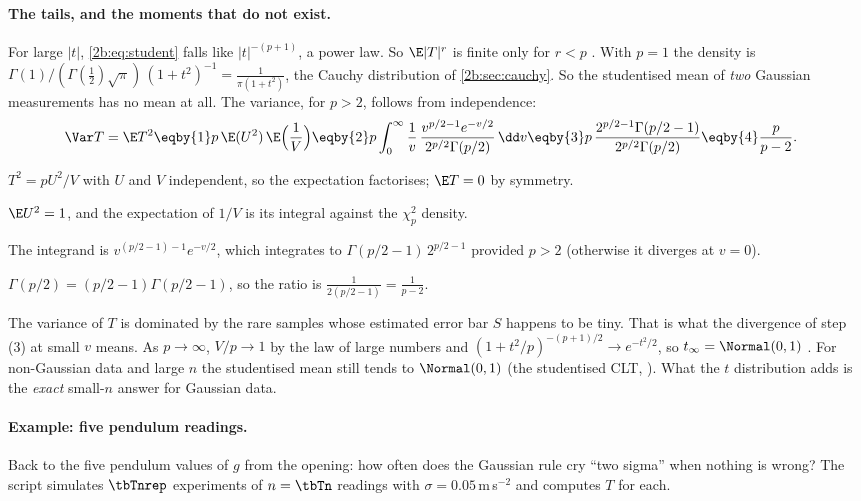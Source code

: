 \paragraph{The tails, and the moments that do not exist.} For large $|t|$, \eqref{2b:eq:student} falls like $|t|^{-(p+1)}$, a power law. So $\E|T|^r$ is finite only for $r<p$ . With $p=1$ the density is $\Gamma(1)/(\Gamma(\frac12)\sqrt\pi)\,(1+t^2)^{-1}=\frac{1}{\pi(1+t^2)}$, the Cauchy distribution of \cref{2b:sec:cauchy}. So the studentised mean of \emph{two} Gaussian measurements has no mean at all. The variance, for $p>2$, follows from independence:
\begin{align}
  \Var T=\E T^2
  &\eqby{1} p\,\E(U^2)\,\E\Bigl(\frac1V\Bigr)
   \eqby{2} p\int_0^\infty\frac1v\,\frac{v^{p/2-1}e^{-v/2}}{2^{p/2}\Gamma(p/2)}\,\dd v
   \eqby{3} p\,\frac{2^{p/2-1}\Gamma(p/2-1)}{2^{p/2}\Gamma(p/2)}
   \eqby{4} \frac{p}{p-2} .
  \label{2b:eq:t-var}
\end{align}
\begin{explain}
  \item $T^2=pU^2/V$ with $U$ and $V$ independent, so the expectation factorises; $\E T=0$ by symmetry.
  \item $\E U^2=1$, and the expectation of $1/V$ is its integral against the $\chi^2_p$ density.
  \item The integrand is $v^{(p/2-1)-1}e^{-v/2}$, which integrates to $\Gamma(p/2-1)\,2^{p/2-1}$ provided $p>2$ (otherwise it diverges at $v=0$).
  \item $\Gamma(p/2)=(p/2-1)\Gamma(p/2-1)$, so the ratio is $\frac{1}{2(p/2-1)}=\frac1{p-2}$.
\end{explain}
The variance of $T$ is dominated by the rare samples whose estimated error bar $S$ happens to be tiny. That is what the divergence of step (3) at small $v$ means. As $p\to\infty$, $V/p\to1$ by the law of large numbers and $(1+t^2/p)^{-(p+1)/2}\to e^{-t^2/2}$, so $t_\infty=\Normal(0,1)$ . For non-Gaussian data and large $n$ the studentised mean still tends to $\Normal(0,1)$ (the studentised CLT, ). What the $t$ distribution adds is the \emph{exact} small-$n$ answer for Gaussian data.

\paragraph{Example: five pendulum readings.} Back to the five pendulum values of $g$ from the opening: how often does the Gaussian rule cry ``two sigma'' when nothing is wrong? The script simulates $\tbTnrep$ experiments of $n=\tbTn$ readings with $\sigma=0.05$\,m\,s$^{-2}$ and computes $T$ for each.


